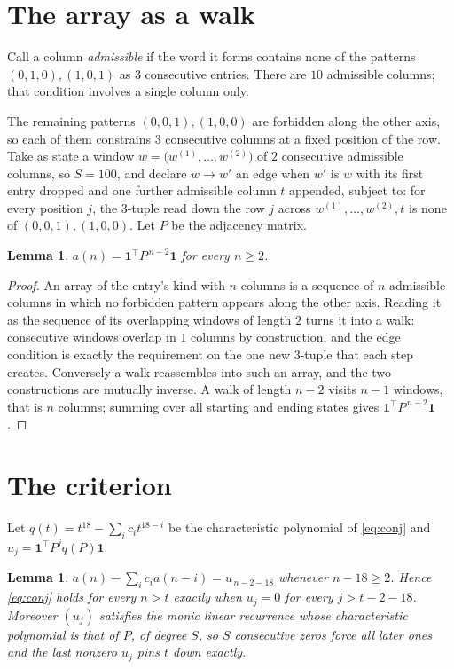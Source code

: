 \documentclass[11pt,a4paper]{article}
\theoremstyle{plain}
\newtheorem{lemma}[theorem]{Lemma}
\theoremstyle{definition}
\begin{document}
\section{The array as a walk}

Call a column \emph{admissible} if the word it forms contains none of the patterns
$(0,1,0), (1,0,1)$ as $3$ consecutive entries. There are $10$ admissible columns; that condition
involves a single column only.

The remaining patterns $(0,0,1), (1,0,0)$ are forbidden along the other axis, so each of them
constrains $3$ consecutive columns at a fixed position of the row. Take as state a
window $w=\bigl(w^{(1)},\dots,w^{(2)}\bigr)$ of $2$ consecutive admissible
columns, so $S=100$, and declare $w\to w'$ an edge when $w'$ is $w$ with its first entry
dropped and one further admissible column $t$ appended, subject to: for every position
$j$, the $3$-tuple read down the row $j$ across $w^{(1)},\dots,w^{(2)},t$
is none of $(0,0,1), (1,0,0)$. Let $P$ be the adjacency matrix.

\begin{lemma}\label{lem:walk}
$a(n)=\mathbf{1}^{\!\top}P^{\,n-2}\mathbf{1}$ for every $n\ge2$.
\end{lemma}

\begin{proof}
An array of the entry's kind with $n$ columns is a sequence of $n$ admissible columns in
which no forbidden pattern appears along the other axis. Reading it as the sequence of its
overlapping windows of length $2$ turns it into a walk: consecutive windows overlap in
$1$ columns by construction, and the edge condition is exactly the requirement on the one
new $3$-tuple that each step creates. Conversely a walk reassembles into such an array,
and the two constructions are mutually inverse. A walk of length $n-2$ visits $n-1$
windows, that is $n$ columns; summing over all starting and ending states gives
$\mathbf{1}^{\!\top}P^{\,n-2}\mathbf{1}$.
\end{proof}

\section{The criterion}

Let $q(t)=t^{18}-\sum_i c_i t^{18-i}$ be the characteristic polynomial of
\eqref{eq:conj} and $u_j=\mathbf{1}^{\!\top}P^{j}q(P)\mathbf{1}$.

\begin{lemma}\label{lem:crit}
$a(n)-\sum_i c_i a(n-i)=u_{\,n-2-18}$ whenever $n-18\ge2$. Hence
\eqref{eq:conj} holds for every $n>t$ exactly when $u_j=0$ for every
$j>t-2-18$. Moreover $(u_j)$ satisfies the monic linear recurrence whose
characteristic polynomial is that of $P$, of degree $S$, so $S$ consecutive zeros force all
later ones and the last nonzero $u_j$ pins $t$ down exactly.
\end{lemma}
\end{document}
